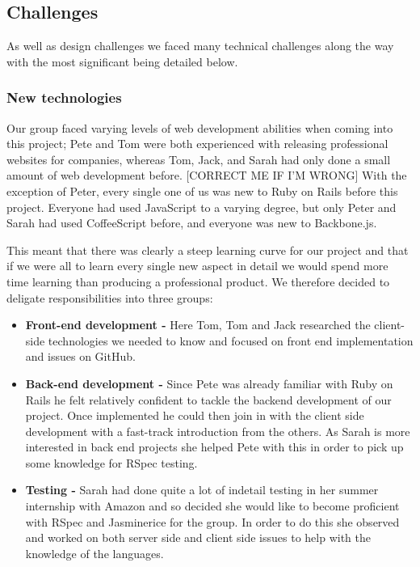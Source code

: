 \subsection{Challenges}
As well as design challenges we faced many technical challenges along the way with the most significant being detailed below.
  \subsubsection{New technologies}
    Our group faced varying levels of web development abilities when coming into this project; Pete and Tom were both experienced with releasing professional websites for companies, whereas Tom, Jack, and Sarah had only done a small amount of web development before. [CORRECT ME IF I'M WRONG]
    With the exception of Peter, every single one of us was new to Ruby on Rails before this project. Everyone had used JavaScript to a varying degree, but only Peter and Sarah had used CoffeeScript before, and everyone was new to Backbone.js.

    This meant that there was clearly a steep learning curve for our project and that if we were all to learn every single new aspect in detail we would spend more time learning than producing a professional product.
    We therefore decided to deligate responsibilities into three groups:
    \begin{itemize}
      \item \textbf{Front-end development -} Here Tom, Tom and Jack researched the client-side technologies we needed to know and focused on front end implementation and issues on GitHub.
      \item \textbf{Back-end development -} Since Pete was already familiar with Ruby on Rails he felt relatively confident to tackle the backend development of our project. Once implemented he could then join in with the client side development with a fast-track introduction from the others. As Sarah is more interested in back end projects she helped Pete with this in order to pick up some knowledge for RSpec testing.
      \item \textbf{Testing -} Sarah had done quite a lot of indetail testing in her summer internship with Amazon and so decided she would like to become proficient with RSpec and Jasminerice for the group. In order to do this she observed and worked on both server side and client side issues to help with the knowledge of the languages.
    \end{itemize}

